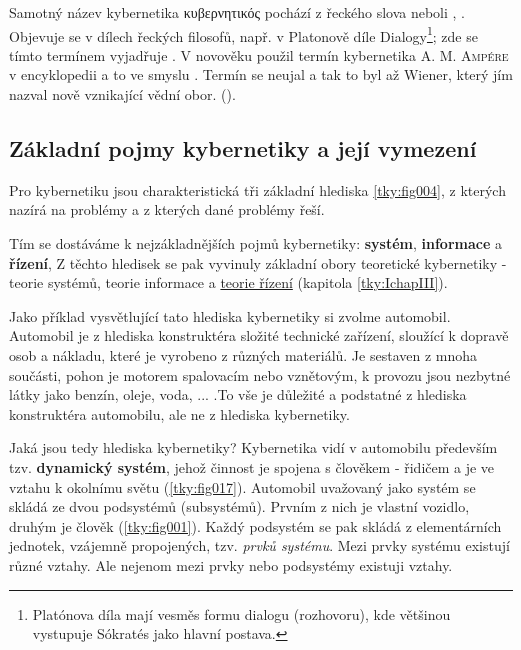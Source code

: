     Samotný název kybernetika \foreignlanguage{greek}{κυβερνητικός} pochází z řeckého slova
     neboli , . Objevuje se v dílech řeckých
    filosofů, např. v Platonově díle Dialogy\footnote{Platónova díla mají vesměs formu dialogu
    (rozhovoru), kde většinou vystupuje Sókratés jako hlavní postava.}; zde se tímto termínem
    vyjadřuje . V novověku použil termín
    kybernetika \textsc{A. M. Ampére} v encyklopedii a to ve smyslu .
    Termín se neujal a tak to byl až Wiener, který jím nazval nově vznikající vědní obor.
    (\cite[s.~6]{Svarc1986}).

    \subsection{Základní pojmy kybernetiky a její vymezení}
      Pro kybernetiku jsou charakteristická tři základní hlediska \ref{tky:fig004}, z kterých nazírá
      na problémy a z kterých dané problémy řeší.

      
      Tím se dostáváme k nejzákladnějších pojmů kybernetiky: \textbf{systém}, \textbf{informace} a
      \textbf{řízení}, Z těchto hledisek se pak vyvinuly základní obory teoretické kybernetiky -
      teorie systémů, teorie informace a \hyperlink{tky:IchapIII}{teorie řízení} (kapitola
      \ref{tky:IchapIII}).
      
      Jako příklad vysvětlující tato hlediska kybernetiky si zvolme automobil. Automobil je z 
      hlediska konstruktéra složité technické zařízení, sloužící k dopravě osob a nákladu, které je 
      vyrobeno z různých materiálů. Je sestaven z mnoha součásti, pohon je motorem spalovacím nebo 
      vznětovým, k provozu jsou nezbytné látky jako benzín, oleje, voda, ... .To vše je důležité a 
      podstatné z hlediska konstruktéra automobilu, ale ne z hlediska kybernetiky.


      Jaká jsou tedy hlediska kybernetiky? Kybernetika vidí v automobilu především tzv.
      \textbf{dynamický systém}, jehož činnost je spojena s člověkem - řidičem a je ve vztahu k
      okolnímu světu (\ref{tky:fig017}). Automobil uvažovaný jako systém se skládá ze dvou
      podsystémů (subsystémů). Prvním z nich je vlastní vozidlo, druhým je člověk
      (\ref{tky:fig001}). Každý podsystém se pak skládá z elementárních jednotek, vzájemně
      propojených, tzv. \emph{prvků systému}. Mezi prvky systému existují různé vztahy. Ale nejenom
      mezi prvky nebo podsystémy existuji vztahy.


